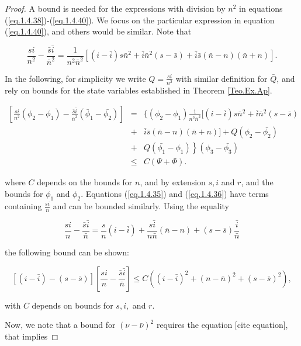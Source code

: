 \begin{proof}
A bound is needed for the expressions with division by $n^2$ in equations (\ref{eq.1.4.38})-(\ref{eq.1.4.40}). We focus on the particular expression in equation (\ref{eq.1.4.40}), and others would be similar. Note that

\begin{equation*}
\frac{si}{n^2}-\frac{\bar{s}\bar{i}}{\bar{n}^2}=\frac{1}{n^2\bar{n}^2}[(i-\bar{i})s\bar{n}^2+\bar{i}\bar{n}^2(s-\bar{s})+\bar{i}\bar{s}(\bar{n}-n)(\bar{n}+n)].
\end{equation*}

In the following, for simplicity we write $Q=\frac{si}{n^2}$ with similar definition for $\bar{Q}$, and rely on bounds for the state variables established in Theorem \ref{Teo.Ex.Ap}.

\begin{eqnarray}
\left[\frac{si}{n^2}(\phi_2-\phi_1)-\frac{\bar{s}\bar{i}}{\bar{n}^2}(\bar{\phi}_1-\bar{\phi_2})\right]&=&\{(\phi_2-\phi_1)\frac{1}{n^2\bar{n}^2}[(i-\bar{i})s\bar{n}^2+\bar{i}\bar{n}^2(s-\bar{s})\nonumber\\
&+&\bar{i}\bar{s}(\bar{n}-n)(\bar{n}+n)]+Q(\phi_2-\bar{\phi_2})\nonumber\\
&+&\left. Q(\bar{\phi_1}-\phi_1)\right\}(\phi_3-\bar{\phi_3})\nonumber \\
&\leq& C(\Psi+\Phi). \label{eq.1.4.44}
\end{eqnarray}

where $C$ depends on the bounds for $n$, and by extension $s,i$ and $r$, and the bounds for $\phi_1$ and $\phi_2$. Equations (\ref{eq.1.4.35}) and (\ref{eq.1.4.36}) have terms containing $\frac{si}{n}$ and can be bounded similarly. Using the equality

\begin{equation*}
\frac{si}{n}-\frac{\bar{s}\bar{i}}{\bar{n}}=\frac{s}{n}(i-\bar{i})+\frac{s\bar{i}}{n\bar{n}}(\bar{n}-n)+(s-\bar{s})\frac{\bar{i}}{\bar{n}}
\end{equation*}

the following bound can be shown:

\begin{equation}\label{eq.1.4.45}
[(i-\bar{i})-(s-\bar{s})]\left[\frac{si}{n}-\frac{\bar{s}\bar{i}}{\bar{n}}\right]\leq C((i-\bar{i})^2+(n-\bar{n})^2+(s-\bar{s})^2),
\end{equation}

with $C$ depends on bounds for $s,i,$ and $r$.

Now, we note that a bound for $(\nu-\bar{\nu})^2$ requires the equation [cite equation], that implies


\end{proof}
